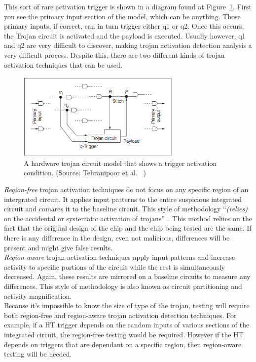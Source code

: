\documentclass[letterpaper,twocolumn,11pt]{article}
\begin{document}
This sort of rare activation trigger is shown in a diagram found at Figure~\ref{activation}. First you see the primary input section of the model, which can be anything. Those primary inputs, if correct, can in turn trigger either q1 or q2. Once this occurs, the Trojan circuit is activated and the payload is executed. Usually however, q1 and q2 are very difficult to discover, making trojan activation detection analysis a very difficult process. Despite this, there are two different kinds of trojan activation techniques that can be used. \\

\begin{figure}[ht!]
\centering
\includegraphics[width=80mm]{images/act.png}
\caption{A hardware trojan circuit model that shows a trigger activation condition. (Source: Tehranipoor et al. ~\cite {teh})}
\label{activation}
\end{figure}

{\em Region-free} trojan activation techniques do not focus on any specific region of an intergrated circuit. It applies input patterns to the entire suspicious integrated circuit and comares it to the baseline circuit. This style of methodology ``{\em (relies)} on the accidental or systematic activation of trojans''~\cite {teh}. This method reliies on the fact that the original design of the chip and the chip being tested are the same. If there is any difference in the design, even not malicious, differences will be present and might give false results. \\

{\em Region-aware} trojan activation techniques apply input patterns and increase activity to specific portions of the circuit while the rest is simultaneously decreased. Again, these results are mirrored on a baseline circuits to measure any differences. This style of methodology is also known as circuit partitioning and activity magnification. \\

Because it's impossible to know the size of type of the trojan, testing will require both region-free and region-aware trojan activation detection techniques. For example, if a HT trigger depends on the random inputs of various sections of the integrated circuit, the region-free testing would be required. However if the HT depends on triggers that are dependant on a specific region, then region-aware testing will be needed.
\end{document}
